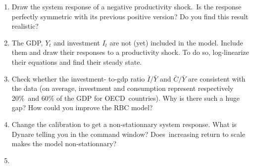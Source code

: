 \documentclass[a4paper,12pt]{article}%
\begin{document}
\begin{enumerate}
\item Draw the system response of a negative productivity shock.\ Is the
response perfectly symmetric with its previous positive version? Do you find
this result realistic?

\item The GDP, $Y_{t}$ and investment $I_{t}$ are not (yet) included in the
model. Include them and draw their responses to a productivity shock. To do
so, log-linearize their equations and find their steady state.

\item Check whether the investment- to-gdp ratio $\bar{I}/\bar{Y}$ and
$\bar{C}/\bar{Y}$ are consistent with the data (on average, investment and
consumption represent respectively 20\%\ and 60\% of the GDP for
OECD\ countries). Why is there such a huge gap? How could you improve the RBC model?

\item Change the calibration to get a non-stationnary system response. What is
Dynare telling you in the command window? Does\ increasing return to scale
makes the model non-stationnary?

\item 
\end{enumerate}%

\footnotesize

%
\normalsize
\end{document}
